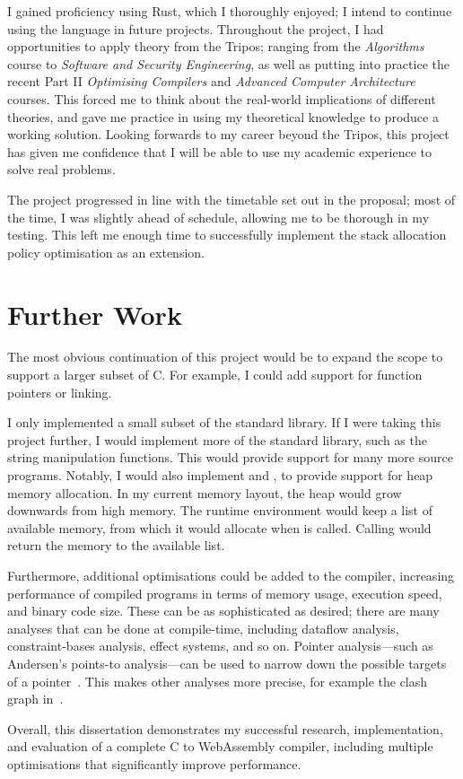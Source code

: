 \documentclass[00-main.tex]{subfiles}
\begin{document}
I gained proficiency using Rust, which I thoroughly enjoyed; I intend to continue using the language in future projects.
Throughout the project, I had opportunities to apply theory from the Tripos; ranging from the \emph{Algorithms} course to \emph{Software and Security Engineering}, as well as putting into practice the recent Part II \emph{Optimising Compilers} and \emph{Advanced Computer Architecture} courses.
This forced me to think about the real-world implications of different theories, and gave me practice in using my theoretical knowledge to produce a working solution.
Looking forwards to my career beyond the Tripos, this project has given me confidence that I will be able to use my academic experience to solve real problems.

The project progressed in line with the timetable set out in the proposal; most of the time, I was slightly ahead of schedule, allowing me to be thorough in my testing.
This left me enough time to successfully implement the stack allocation policy optimisation as an extension.

\section{Further Work}

The most obvious continuation of this project would be to expand the scope to support a larger subset of C.
For example, I could add support for function pointers or linking.

I only implemented a small subset of the standard library.
If I were taking this project further, I would implement more of the standard library, such as the string manipulation functions.
This would provide support for many more source programs.
Notably, I would also implement  and , to provide support for heap memory allocation.
In my current memory layout, the heap would grow downwards from high memory.
The runtime environment would keep a list of available memory, from which it would allocate when  is called.
Calling  would return the memory to the available list.

Furthermore, additional optimisations could be added to the compiler, increasing performance of compiled programs in terms of memory usage, execution speed, and binary code size.
These can be as sophisticated as desired; there are many analyses that can be done at compile-time, including dataflow analysis, constraint-bases analysis, effect systems, and so on.
Pointer analysis---such as Andersen's points-to analysis---can be used to narrow down the possible targets of a pointer~.
This makes other analyses more precise, for example the clash graph in~.


Overall, this dissertation demonstrates my successful research, implementation, and evaluation of a complete C to Web\-Assembly compiler, including multiple optimisations that significantly improve performance.
\end{document}
